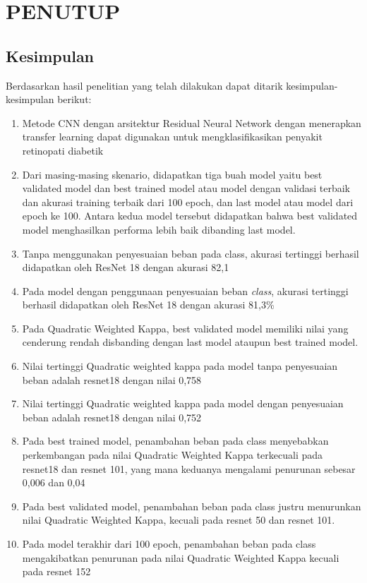 \chapter{PENUTUP}
\label{chap:penutup}

\section{Kesimpulan}
\label{sec:kesimpulan}

Berdasarkan hasil penelitian yang telah dilakukan dapat ditarik kesimpulan-kesimpulan berikut:

\begin{enumerate}[nolistsep]
	
\item Metode CNN dengan arsitektur Residual Neural Network dengan menerapkan transfer learning dapat digunakan untuk mengklasifikasikan penyakit retinopati diabetik
\item Dari masing-masing skenario, didapatkan tiga buah model yaitu best validated model dan best trained model atau model dengan validasi terbaik dan akurasi training terbaik dari 100 epoch, dan last model atau model dari epoch ke 100. Antara kedua model tersebut didapatkan bahwa best validated model menghasilkan performa lebih baik dibanding last model.
\item Tanpa menggunakan penyesuaian beban pada class, akurasi tertinggi berhasil didapatkan oleh ResNet 18 dengan akurasi 82,1%
\item Pada model dengan penggunaan penyesuaian beban \emph{class}, akurasi tertinggi berhasil didapatkan oleh ResNet 18 dengan akurasi 81,3\%
\item Pada Quadratic Weighted Kappa, best validated model memiliki nilai yang cenderung rendah disbanding dengan last model ataupun best trained model. 
\item Nilai tertinggi Quadratic weighted kappa pada model tanpa penyesuaian beban adalah resnet18 dengan nilai 0,758
\item Nilai tertinggi Quadratic weighted kappa pada model dengan penyesuaian beban adalah resnet18 dengan nilai 0,752
\item Pada best trained model, penambahan beban pada class menyebabkan perkembangan pada nilai Quadratic Weighted Kappa terkecuali pada resnet18 dan resnet 101, yang mana keduanya mengalami penurunan sebesar 0,006 dan 0,04
\item Pada best validated model, penambahan beban pada class justru menurunkan nilai Quadratic Weighted Kappa, kecuali pada resnet 50 dan resnet 101.
\item Pada model terakhir dari 100 epoch, penambahan beban pada class mengakibatkan penurunan pada nilai Quadratic Weighted Kappa kecuali pada resnet 152


\end{enumerate}

